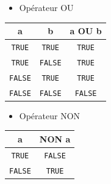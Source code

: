 \documentclass[
]{book}
\providecommand{\tightlist}{%
  \setlength{\itemsep}{0pt}\setlength{\parskip}{0pt}}
\begin{document}
\begin{itemize}
\tightlist
\item
  Opérateur OU
\end{itemize}

\begin{longtable}[]{@{}ccc@{}}
\toprule\noalign{}
a & b & a OU b \\
\midrule\noalign{}
\endhead
\bottomrule\noalign{}
\endlastfoot
\texttt{TRUE} & \texttt{TRUE} & \texttt{TRUE} \\
\texttt{TRUE} & \texttt{FALSE} & \texttt{TRUE} \\
\texttt{FALSE} & \texttt{TRUE} & \texttt{TRUE} \\
\texttt{FALSE} & \texttt{FALSE} & \texttt{FALSE} \\
\end{longtable}

\begin{itemize}
\tightlist
\item
  Opérateur NON
\end{itemize}

\begin{longtable}[]{@{}cc@{}}
\toprule\noalign{}
a & NON a \\
\midrule\noalign{}
\endhead
\bottomrule\noalign{}
\endlastfoot
\texttt{TRUE} & \texttt{FALSE} \\
\texttt{FALSE} & \texttt{TRUE} \\
\end{longtable}
\end{document}
